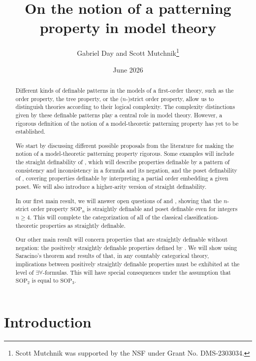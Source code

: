\documentclass{article}
\title{On the notion of a patterning property in model theory}
\author{Gabriel Day and Scott Mutchnik\footnote{Scott Mutchnik was supported by the NSF under Grant No. DMS-2303034.}}
\date{June 2026}
\theoremstyle{definition}
\theoremstyle{definition}
\theoremstyle{definition}
\begin{document}
\maketitle

\begin{abstract}

Different kinds of definable patterns in the models of a first-order theory, such as the order property, the tree property, or the ($n$-)strict order property, allow us to distinguish theories according to their logical complexity. The complexity distinctions given by these definable patterns play a central role in model theory. However, a rigorous definition of the notion of a model-theoretic patterning property has yet to be established.

We start by discussing different possible proposals from the literature for making the notion of a model-theoretic patterning property rigorous. Some examples will include the straight definability of \cite{shelah_what_2000}, which will describe properties definable by a pattern of consistency and inconsistency in a formula and its negation, and the poset definability of \cite{garcia2022model}, covering properties definable by interpreting a partial order embedding a given poset. We will also introduce a higher-arity version of straight definability.

In our first main result, we will answer open questions of \cite{bailetti2024walk} and \cite{garcia2022model}, showing that the $n$-strict order property $\mathrm{SOP}_{n}$ is straightly definable and poset definable even for integers $n \geq 4$. This will complete the categorization of all of the classical classification-theoretic properties as straightly definable.

Our other main result will concern properties that are straightly definable without negation: the positively straightly definable properties defined by \cite{bailetti2024walk}. We will show using Saracino's theorem and results of \cite{bodirsky2025taking} that, in any countably categorical theory, implications between positively straightly definable properties must be exhibited at the level of $\exists\forall$-formulas. This will have special consequences under the assumption that $\mathrm{SOP}_{2}$ is equal to $\mathrm{SOP}_{3}$.
    
\end{abstract}

\section{Introduction}
\end{document}
